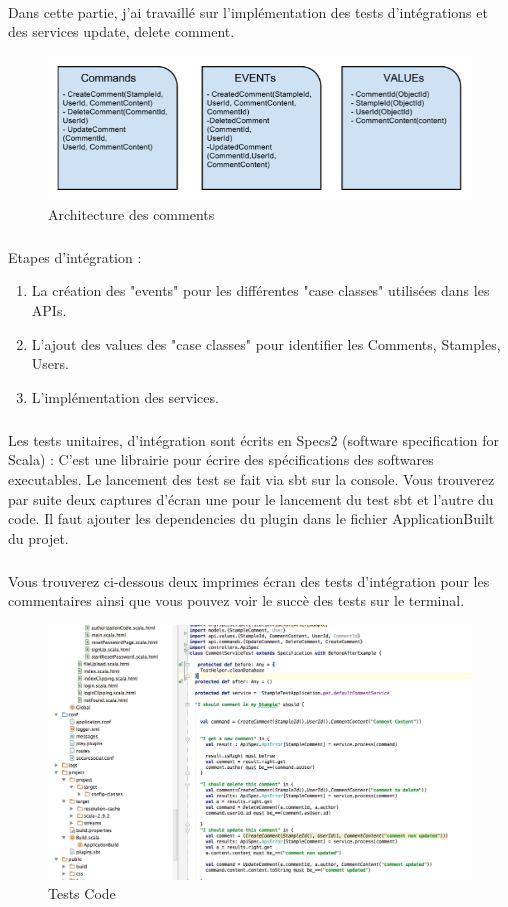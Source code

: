 \paragraph{}
Dans cette partie, j'ai travaillé sur l'implémentation des tests d'intégrations et des services update, delete comment.
\begin{figure}[H]
        \centering
                \centering
                \includegraphics[width=\textwidth]{Comment.png}
               \caption{Architecture des comments}
		\label{fig:Design des commentaires}
\end{figure}
\subparagraph{}
Etapes d'intégration :
\begin{enumerate}
\item La création des "events" pour les différentes "case classes" utilisées dans les APIs.
\item L'ajout des values des "case classes" pour identifier les Comments, Stamples, Users. 
\item L'implémentation des services.
\end{enumerate}
\subparagraph{}
Les tests unitaires, d'intégration sont écrits en Specs2 (software specification for Scala) : C'est une librairie pour écrire des spécifications des softwares executables. Le lancement des test se fait via sbt sur la console.
Vous trouverez par suite deux captures d'écran une pour le lancement du test sbt et l'autre du code.
Il faut ajouter les dependencies du plugin dans le fichier ApplicationBuilt du projet.
\newpage
\subparagraph{}
Vous trouverez ci-dessous deux imprimes écran des tests d'intégration pour les commentaires ainsi que vous pouvez voir le succè des tests sur le terminal.
\begin{figure}[H]
        \centering
                \centering
                \includegraphics[width=\textwidth]{test.png}
               \caption{Tests Code}
		\label{fig:Test Code}
\end{figure}
